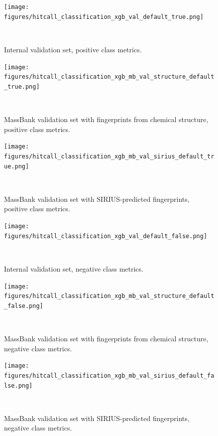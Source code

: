 \begin{figure}
  \centering
  \texttt{[image: figures/hitcall\_classification\_xgb\_val\_default\_true.png]}
  \caption{Internal validation set, positive class metrics.}
~\label{fig:hitcall_classification_xgb_val_default_true}
\end{figure}

\begin{figure}
  \centering
  \texttt{[image: figures/hitcall\_classification\_xgb\_mb\_val\_structure\_default\_true.png]}
  \caption{MassBank validation set with fingerprints from chemical structure, positive class metrics.}
~\label{fig:hitcall_classification_xgb_mb_val_structure_default_true}
\end{figure}

\begin{figure}
  \centering
  \texttt{[image: figures/hitcall\_classification\_xgb\_mb\_val\_sirius\_default\_true.png]}
  \caption{MassBank validation set with SIRIUS-predicted fingerprints, positive class metrics.}
~\label{fig:hitcall_classification_xgb_mb_val_sirius_default_true}
\end{figure}


\begin{figure}
  \centering
  \texttt{[image: figures/hitcall\_classification\_xgb\_val\_default\_false.png]}
  \caption{Internal validation set, negative class metrics.}
~\label{fig:hitcall_classification_xgb_val_default_false}
\end{figure}

\begin{figure}
  \centering
  \texttt{[image: figures/hitcall\_classification\_xgb\_mb\_val\_structure\_default\_false.png]}
  \caption{MassBank validation set with fingerprints from chemical structure, negative class metrics.}
~\label{fig:hitcall_classification_xgb_mb_val_structure_default_false}
\end{figure}

\begin{figure}
  \centering
  \texttt{[image: figures/hitcall\_classification\_xgb\_mb\_val\_sirius\_default\_false.png]}
  \caption{MassBank validation set with SIRIUS-predicted fingerprints, negative class metrics.}
~\label{fig:hitcall_classification_xgb_mb_val_sirius_default_false}
\end{figure}

\newpage

\section{}











